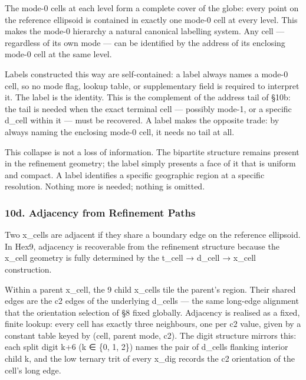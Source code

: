\documentclass[
  11pt,
  a4paper,
]{article}
\begin{document}
The mode-0 cells at each level form a complete cover of the globe: every
point on the reference ellipsoid is contained in exactly one mode-0 cell
at every level. This makes the mode-0 hierarchy a natural canonical
labelling system. Any cell --- regardless of its own mode --- can be
identified by the address of its enclosing mode-0 cell at the same
level.

Labels constructed this way are self-contained: a label always names a
mode-0 cell, so no mode flag, lookup table, or supplementary field is
required to interpret it. The label is the identity. This is the
complement of the address tail of §10b: the tail is needed when the
exact terminal cell --- possibly mode-1, or a specific d\_cell within it
--- must be recovered. A label makes the opposite trade: by always
naming the enclosing mode-0 cell, it needs no tail at all.

This collapse is not a loss of information. The bipartite structure
remains present in the refinement geometry; the label simply presents a
face of it that is uniform and compact. A label identifies a specific
geographic region at a specific resolution. Nothing more is needed;
nothing is omitted.

\subsubsection{10d. Adjacency from Refinement
Paths}\label{d.-adjacency-from-refinement-paths}

Two x\_cells are adjacent if they share a boundary edge on the reference
ellipsoid. In Hex9, adjacency is recoverable from the refinement
structure because the x\_cell geometry is fully determined by the
t\_cell → d\_cell → x\_cell construction.

Within a parent x\_cell, the 9 child x\_cells tile the parent's region.
Their shared edges are the c2 edges of the underlying d\_cells --- the
same long-edge alignment that the orientation selection of §8 fixed
globally. Adjacency is realised as a fixed, finite lookup: every cell
has exactly three neighbours, one per c2 value, given by a constant
table keyed by (cell, parent mode, c2). The digit structure mirrors
this: each split digit k+6 (k ∈ \{0, 1, 2\}) names the pair of d\_cells
flanking interior child k, and the low ternary trit of every x\_dig
records the c2 orientation of the cell's long edge.
\end{document}
